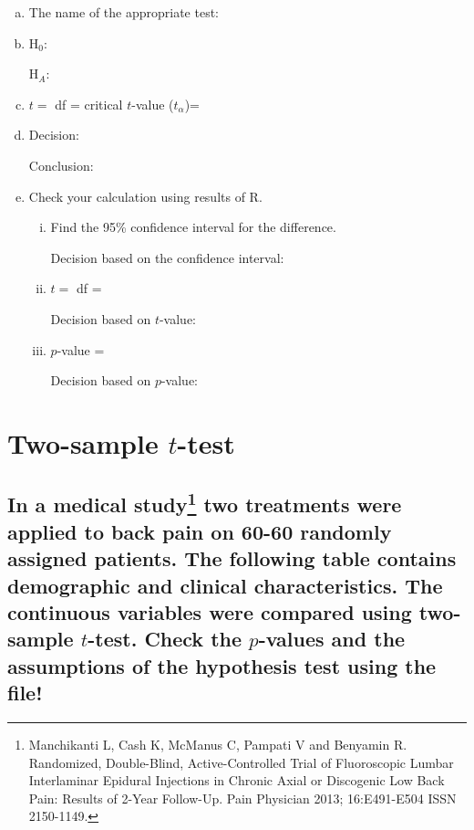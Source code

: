 				
\begin{enumerate}[a)]
\item The name of the appropriate test: \hrulefill
\item H$_0$:	 \hrulefill


	 H$_A$:	 \hrulefill
\item $t =$ 	 \hrulefill\quad  df = \hrulefill \quad critical $t$-value ($t_\alpha$)= \hrulefill
\item Decision: 	 \hrulefill

	 Conclusion: \hrulefill


\item Check your calculation using results of R.





	\begin{enumerate}[i)]
	\item Find the 95\% confidence interval for the difference. 	 \hrulefill
	
	
		Decision based on the confidence interval: 		\hrulefill
	\item $t =$ 	 \hrulefill\quad df = 	\hrulefill	
	
		 Decision based on $t$-value: 	\hrulefill
	\item $p$-value = \hrulefill 
	
		Decision based on $p$-value: 	\hrulefill
	\end{enumerate}
\end{enumerate}






\section{Two-sample $t$-test}
\subsection[Back pain comparison]{In a medical study\footnote{Manchikanti L, Cash K, McManus C, Pampati V and Benyamin R. Randomized, Double-Blind, Active-Controlled Trial of Fluoroscopic Lumbar Interlaminar Epidural Injections in Chronic Axial or Discogenic Low Back Pain: Results of 2-Year Follow-Up. Pain Physician 2013; 16:E491-E504  ISSN 2150-1149.} two treatments were applied to back pain on 60-60 randomly assigned patients.
The following table contains demographic and clinical characteristics.  The continuous variables were compared using two-sample $t$-test. Check the $p$-values and the assumptions of the hypothesis test using the  file!}
	
